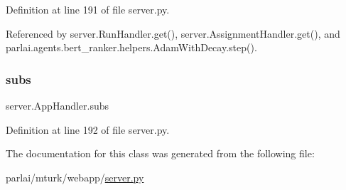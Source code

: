 Definition at line 191 of file server.\+py.



Referenced by server.\+Run\+Handler.\+get(), server.\+Assignment\+Handler.\+get(), and parlai.\+agents.\+bert\+\_\+ranker.\+helpers.\+Adam\+With\+Decay.\+step().

\mbox{\label{classserver_1_1AppHandler_a27d0c3562206305f6ef888763224f3e6}} 
\subsubsection{\texorpdfstring{subs}{subs}}
{\footnotesize\ttfamily server.\+App\+Handler.\+subs}



Definition at line 192 of file server.\+py.



The documentation for this class was generated from the following file\+:\begin{DoxyCompactItemize}
\item 
parlai/mturk/webapp/\hyperlink{server_8py}{server.\+py}\end{DoxyCompactItemize}
